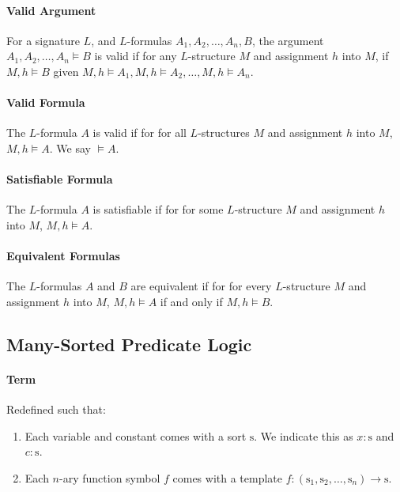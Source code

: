 \documentclass[10pt,twoside,twocolumn]{article}
\begin{document}
\paragraph{Valid Argument}

For a signature $L$, and $L$-formulas $A_{1},A_{2},\dots,A_{n},B$,
the argument $A_{1},A_{2},\dots,A_{n}\vDash B$ is valid if for any
$L$-structure $M$ and assignment $h$ into $M$, if $M,h\vDash B$
given $M,h\vDash A_{1},M,h\vDash A_{2},\dots,M,h\vDash A_{n}$.


\paragraph{Valid Formula}

The $L$-formula $A$ is valid if for for all $L$-structures $M$
and assignment $h$ into $M$, $M,h\vDash A$. We say $\vDash A$.


\paragraph{Satisfiable Formula}

The $L$-formula $A$ is satisfiable if for for some $L$-structure
$M$ and assignment $h$ into $M$, $M,h\vDash A$.


\paragraph{Equivalent Formulas}

The $L$-formulas $A$ and $B$ are equivalent if for for every $L$-structure
$M$ and assignment $h$ into $M$, $M,h\vDash A$ if and only if
$M,h\vDash B$.


\subsection{Many-Sorted Predicate Logic}


\paragraph{Term}

Redefined such that:
\begin{enumerate}
\item Each variable and constant comes with a sort $\mbox{s}$. We indicate
this as $x:\mbox{s}$ and $c:\mbox{s}$.
\item Each $n$-ary function symbol $f$ comes with a template $f:\left(\mbox{s}_{1},\mbox{s}_{2},\dots,\mbox{s}_{n}\right)\rightarrow\mbox{s}$.
\end{enumerate}
\end{document}
